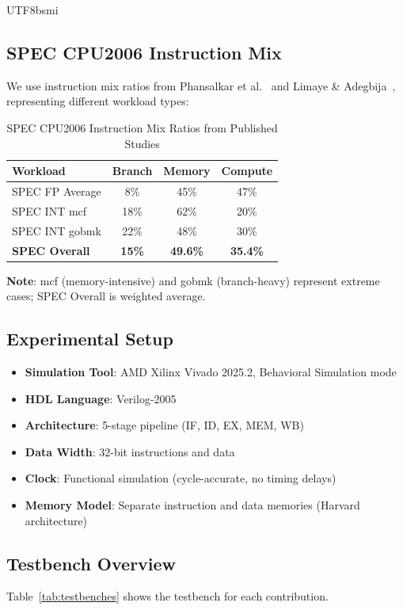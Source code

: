 \documentclass[journal,twoside]{IEEEtran}
\begin{document}
\begin{CJK}{UTF8}{bsmi}
\subsection{SPEC CPU2006 Instruction Mix}
We use instruction mix ratios from Phansalkar et al.~\cite{phansalkar2007analysis} and Limaye \& Adegbija~\cite{limaye2018workload}, representing different workload types:

\begin{table}[!t]
\centering
\caption{SPEC CPU2006 Instruction Mix Ratios from Published Studies}
\label{tab:specmix}
\footnotesize
\begin{tabular}{@{}lccc@{}}
\toprule
\textbf{Workload} & \textbf{Branch} & \textbf{Memory} & \textbf{Compute} \\
\midrule
SPEC FP Average & 8\% & 45\% & 47\% \\
SPEC INT mcf & 18\% & 62\% & 20\% \\
SPEC INT gobmk & 22\% & 48\% & 30\% \\
\textbf{SPEC Overall} & \textbf{15\%} & \textbf{49.6\%} & \textbf{35.4\%} \\
\bottomrule
\end{tabular}
\end{table}

\textbf{Note}: mcf (memory-intensive) and gobmk (branch-heavy) represent extreme cases; SPEC Overall is weighted average.

\subsection{Experimental Setup}
\begin{itemize}
    \item \textbf{Simulation Tool}: AMD Xilinx Vivado 2025.2, Behavioral Simulation mode
    \item \textbf{HDL Language}: Verilog-2005
    \item \textbf{Architecture}: 5-stage pipeline (IF, ID, EX, MEM, WB)
    \item \textbf{Data Width}: 32-bit instructions and data
    \item \textbf{Clock}: Functional simulation (cycle-accurate, no timing delays)
    \item \textbf{Memory Model}: Separate instruction and data memories (Harvard architecture)
\end{itemize}

\subsection{Testbench Overview}
Table~\ref{tab:testbenches} shows the testbench for each contribution.


\end{CJK}
\end{document}
